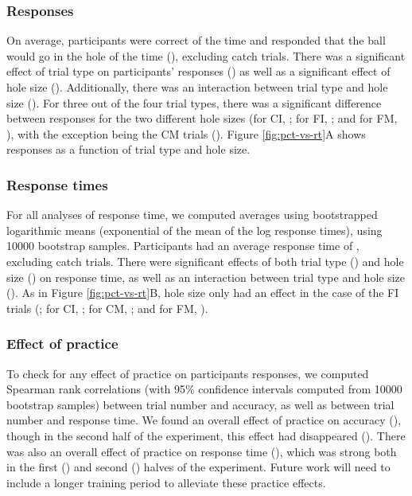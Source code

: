 \documentclass[10pt,letterpaper]{article}
\begin{document}
\subsubsection{Responses}

On average, participants were correct \AvgCorrect{} of the time and responded that the ball would go in the hole \AvgResponse{} of the time (\ResponseN{}), excluding catch trials.
There was a significant effect of trial type on participants' responses (\ResponseHoleClass{}) as well as a significant effect of hole size (\ResponseHoleSize{}).
Additionally, there was an interaction between trial type and hole size (\ResponseFull{}).
For three out of the four trial types, there was a significant difference between responses for the two different hole sizes (for CI, \ResponseCIttest{}; for FI, \ResponseCIttest{}; and for FM, \ResponseFMttest{}), with the exception being the CM trials (\ResponseCMttest{}).
Figure \ref{fig:pct-vs-rt}A shows responses as a function of trial type and hole size.

\subsubsection{Response times}

For all analyses of response time, we computed averages using bootstrapped logarithmic means (exponential of the mean of the log response times), using 10000 bootstrap samples.
Participants had an average response time of \AvgRT{}, excluding catch trials.
There were significant effects of both trial type (\RTHoleClass{}) and hole size (\RTHoleSize{}) on response time, as well as an interaction between trial type and hole size (\RTFull{}).
As in Figure \ref{fig:pct-vs-rt}B, hole size only had an effect in the case of the FI trials (\ResponsetimeFIttest{}; for CI, \ResponsetimeCIttest{}; for CM, \ResponsetimeCMttest{}; and for FM, \ResponsetimeFMttest{}).

\subsubsection{Effect of practice}

To check for any effect of practice on participants responses, we computed Spearman rank correlations (with 95\% confidence intervals computed from 10000 bootstrap samples) between trial number and accuracy, as well as between trial number and response time.
We found an overall effect of practice on accuracy (\ResponseTrialCorr{}), though in the second half of the experiment, this effect had disappeared (\ResponseTrialCorrLate{}).
There was also an overall effect of practice on response time (\RTTrialCorr{}), which was strong both in the first (\RTTrialCorrEarly{}) and second (\RTTrialCorrLate{}) halves of the experiment.
Future work will need to include a longer training period to alleviate these practice effects.
\end{document}
